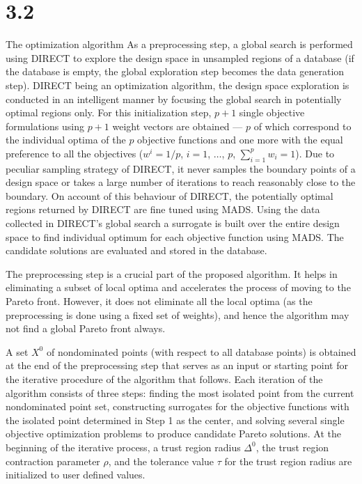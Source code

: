 \section{3.2}{The optimization algorithm} 
As a preprocessing step, a global search is performed using DIRECT to explore
the design space in unsampled regions of a database (if the database is empty,
the global exploration step becomes the data generation step). DIRECT being an
optimization algorithm, the design space exploration is conducted in an
intelligent manner by focusing the global search in potentially optimal regions
only. For this initialization step, $p+1$ single objective formulations using
$p+1$ weight vectors are obtained --- $p$ of which correspond to the individual
optima of the $p$ objective functions and one more with the equal preference to
all the objectives ($w^i=1/p$, $i=1$, $\ldots$, $p$, $\sum_{i=1}^{p}w_i=1$). 
Due to peculiar sampling strategy of DIRECT, it never samples the boundary 
points of a design space or takes a large number of iterations to reach 
reasonably close to the boundary. On account of this behaviour of DIRECT, 
the potentially optimal regions returned by DIRECT are fine tuned using MADS. 
Using the data collected in DIRECT's global search a surrogate is built over 
the entire design space to find individual optimum for each objective function 
using MADS. The candidate solutions are evaluated and stored in the database.

The preprocessing step is a crucial part of the proposed algorithm. It helps 
in eliminating a subset of local optima and accelerates the process of moving 
to the Pareto front. However, it does not eliminate all the local optima (as 
the preprocessing is done using a fixed set of weights), and hence the 
algorithm may not find a global Pareto front always.    

A set $X^0$ of nondominated points (with respect to all database points) is
obtained at the end of the preprocessing step that serves as an input or
starting point for the iterative procedure of the algorithm that follows. 
Each iteration of the algorithm consists of three steps: finding the most 
isolated point from the current nondominated point set, constructing surrogates 
for the objective functions with the isolated point determined in Step 1 as 
the center, and solving several single objective optimization problems to 
produce candidate Pareto solutions. At the beginning of the iterative process, 
a  trust region radius $\Delta^0$, the trust region contraction parameter 
$\rho$, and the tolerance value $\tau$ for the trust region radius are 
initialized to user defined values. \smallskip

